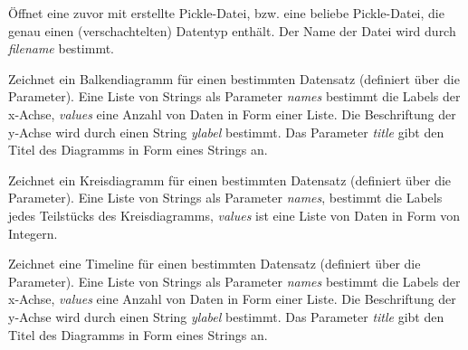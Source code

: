 \documentclass[letterpaper,10pt,english]{sphinxmanual}
\begin{document}

\begin{fulllineitems}
\label{project_3:project_3.open_from_pickle}
Öffnet eine zuvor mit {\hyperref[project_3:project_3.save_as_pickle]{}} erstellte Pickle-Datei, bzw. eine beliebe Pickle-Datei, die genau einen (verschachtelten) Datentyp enthält. Der Name der Datei wird durch \emph{filename} bestimmt.

\end{fulllineitems}


\begin{fulllineitems}
\label{project_3:project_3.draw_barchart}
Zeichnet ein Balkendiagramm für einen bestimmten Datensatz (definiert über die Parameter).
Eine Liste von Strings als Parameter \emph{names} bestimmt die Labels der x-Achse, \emph{values} eine Anzahl von Daten in Form einer Liste. Die Beschriftung der y-Achse wird durch einen String \emph{ylabel} bestimmt. Das Parameter \emph{title} gibt den Titel des Diagramms in Form eines Strings an.

\end{fulllineitems}


\begin{fulllineitems}
\label{project_3:project_3.draw_piechart}
Zeichnet ein Kreisdiagramm für einen bestimmten Datensatz (definiert über die Parameter). Eine Liste von Strings als Parameter \emph{names}, bestimmt die Labels jedes Teilstücks des Kreisdiagramms, \emph{values} ist eine Liste von Daten in Form von Integern.

\end{fulllineitems}


\begin{fulllineitems}
\label{project_3:project_3.draw_timeline}
Zeichnet eine Timeline für einen bestimmten Datensatz (definiert über die Parameter).
Eine Liste von Strings als Parameter \emph{names} bestimmt die Labels der x-Achse, \emph{values} eine Anzahl von Daten in Form einer Liste. Die Beschriftung der y-Achse wird durch einen String \emph{ylabel} bestimmt. Das Parameter \emph{title} gibt den Titel des Diagramms in Form eines Strings an.

\end{fulllineitems}
\end{document}
